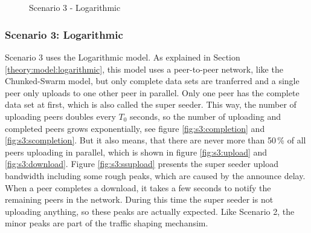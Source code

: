 \begin{figure}[!ht]
	\begin{center}	
		~ %

	 	~ %

		\caption{Scenario 3 - Logarithmic}
		\label{fig:s3}
	\end{center}
\end{figure}

\pagebreak
\subsubsection{Scenario 3: Logarithmic}

Scenario 3 uses the Logarithmic model. As explained in Section \ref{theory:model:logarithmic}, this model uses a peer-to-peer network, like the Chunked-Swarm model, but only complete data sets are tranferred and a single peer only uploads to one other peer in parallel. Only one peer has the complete data set at first, which is also called the super seeder. This way, the number of uploading peers doubles every $T_0$ seconds, so the number of uploading and completed peers grows exponentially, see figure \ref{fig:s3:completion} and \ref{fig:s3:scompletion}. But it also means, that there are never more than 50\,\% of all peers uploading in parallel, which is shown in figure \ref{fig:s3:upload} and \ref{fig:s3:download}. Figure \ref{fig:s3:ssupload} presents the super seeder upload bandwidth including some rough peaks, which are caused by the announce delay. When a peer completes a download, it takes a few seconds to notify the remaining peers in the network. During this time the super seeder is not uploading anything, so these peaks are actually expected. Like Scenario 2, the minor peaks are part of the traffic shaping mechansim.

